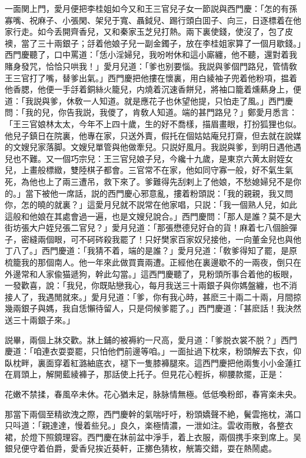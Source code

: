一面関上門，愛月便把李桂姐如今又和王三官兒子女一節説與西門慶：「怎的有孫寡嘴、祝麻子、小張閑、架兒于寬、聶鉞兒、踢行頭白囬子、向三，日逐標着在他家行走。如今丢開齊香兒，又和秦家玉芝兒打熱。兩下裏使錢，使沒了，包了皮襖，當了三十兩銀子；㧱着他娘子兒一副金鐲子，放在李桂姐家算了一個月歇錢。」西門慶聽了，口中罵道：「恁小淫婦兒，我吩咐休和這小廝纏，他不聽，還對着我賭身發咒，恰恰只哄我！」愛月兒道：「爹也别要惱。我説與爹個門路兒，管情敎王三官打了嘴，替爹出氣。」西門慶把他摟在懷裏，用白綾袖子兜着他粉項，揾着他香腮，他便一手㧱着銅絲火籠兒，内燒着沉速香餅兒，將袖口籠着燻爇身上，便道：「我説與爹，休敎一人知道。就是應花子也休望他提，只怕走了風。」西門慶問：「我的兒，你告我説，我儍了，肯敎人知道。端的甚門路兒？」鄭愛月悉言：「王三官娘林太太，今年不上四十歲，生的好不喬樣，描眉畫眼，打扮狐狸也似。他兒子鎮日在院裏，他專在家，只送外賣，假托在個姑姑庵兒打齋，但去就在說媒的文嫂兒家落脚。文嫂兒單管與他做牽兒。只説好風月。我説與爹，到明日遇他遇兒也不難。又一個巧宗兒：王三官兒娘子兒，今纔十九歲，是東京六黄太尉姪女兒，上畫般標緻，雙陸棋子都會。三官常不在家，他如同守寡一般，好不氣生氣死，為他也上了兩三遭吊，救下來了。爹難得先刮剌上了他娘，不愁媳婦兒不是你的。」當下被他一席話，説的西門慶心邪意亂，摟着粉頭説：「我的親親，我又問你，怎的曉的就裏？」這愛月兒就不説常在他家唱，只説：「我一個熟人兒，如此這般和他娘在其處會過一遍，也是文嫂兒說合。」西門慶問：「那人是誰？莫不是大街坊張大户姪兒張二官兒？」愛月兒道：「那張懋德兒好㒲的貨！麻着七八個臉彈子，密縫兩個眼，可不砢硶殺我罷了！只好樊家百家奴兒接他，一向董金兒也與他丁八了。」西門慶道：「我猜不着，端的是誰？」愛月兒道：「敎爹得知了罷，是原梳籠我的那個南人。他一年來此做買賣兩遭。正經他在裏邊歇不的一兩夜，倒只在外邊常和人家偸猫遞狗，幹此勾當。」這西門慶聽了，見粉頭所事合着他的板眼，一發歡喜，說：「我兒，你既貼戀我心，每月我送三十兩銀子與你媽盤纏，也不消接人了，我遇閒就來。」愛月兒道：「爹，你有我心時，甚麽三十兩二十兩，月間掠幾兩銀子與媽，我自恁懶待留人，只是伺候爹罷了。」西門慶道：「甚麽話！我決然送三十兩銀子來。」

説畢，兩個上牀交歡。牀上鋪的被褥約一尺高，愛月道：「爹脱衣裳不脱？」西門慶道：「咱連衣耍耍罷，只怕他們前邊等咱。」一面扯過下枕來，粉頭解去下衣，仰臥枕畔，裏面穿着紅潞紬底衣，褪下一隻膝褲腿來。這西門慶把他兩隻小小金蓮扛在肩頭上，解開藍綾褲子，那話使上托子。但見花心輕拆，柳腰款擺，正是：

\begin{myquote}
花嫩不禁揉，春風卒未休。花心猶未足，脉脉情無極。低低喚粉郎，春宵楽未央。
\end{myquote}

那當下兩個至精欲洩之際，西門慶幹的氣喘吁吁，粉頭嬌聲不絶，鬢雲拖枕，滿口只呌道：「親達達，慢着些兒。」良久，楽極情濃，一泄如注。雲收雨散，各整衣裙，於燈下照鏡理容。西門慶在牀前盆中淨手，着上衣服，兩個携手來到席上。吴銀兒便守着伯爵，愛香兒挨近葵軒，正擲色猜枚，觥籌交錯，耍在熱鬧處。

